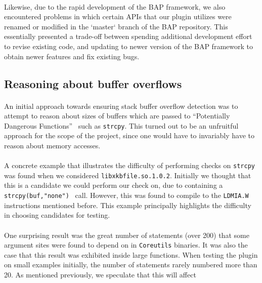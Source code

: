 \documentclass[letterpaper,11pt]{article}
\begin{document}
\paragraph{}
Likewise, due to the rapid development of the BAP framework, we also
encountered problems in which certain APIs that our plugin utilizes were
renamed or modified in the `master` branch of the BAP repository. This
essentially presented a trade-off between spending additional development
effort to revise existing code, and updating to newer version of the BAP
framework to obtain newer features and fix existing bugs.

\subsection{Reasoning about buffer overflows}

\paragraph{}
An initial approach towards ensuring stack buffer overflow detection was to
attempt to reason about sizes of buffers which are passed to ``Potentially
Dangerous Functions''~\cite{seacord2008cert} such as \texttt{strcpy}. This
turned out to be an unfruitful approach for the scope of the project, since one
would have to invariably have to reason about memory accesses.

\paragraph{}
A concrete example that illustrates the difficulty of performing checks on
\texttt{strcpy} was found when we considered \texttt{libxkbfile.so.1.0.2}.
Initially we thought that this is a candidate we could perform our check on,
due to containing a \texttt{strcpy(buf,"none")}~\cite{xorg} call. However, this was found
to compile to the \texttt{LDMIA.W} instructions mentioned before. This example
principally highlights the difficulty in choosing candidates for testing.

\paragraph{}
One surprising result was the great number of statements (over
200) that some argument sites were found to depend on in \texttt{Coreutils}
binaries. It was also the case that this result was exhibited inside large
functions. When testing the plugin on small examples initially, the number of
statements rarely numbered more than 20. As mentioned previously, we speculate
that this will affect
\end{document}
